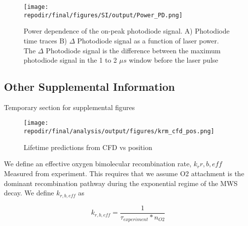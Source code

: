 \begin{figure}[h]
    \texttt{[image: \\repodir/final/figures/SI/output/Power\_PD.png]} 
    \caption{Power dependence of the on-peak photodiode signal. A) Photodiode time traces B) $\Delta$ Photodiode signal as a function of laser power. The $\Delta$ Photodiode signal is the difference between the maximum photodiode signal in the 1 to 2 $\mu s$ window before the laser pulse}
    \label{fig:SI_power_dependence_PD}
\end{figure}

\clearpage

\subsection{Other Supplemental Information}

Temporary section for supplemental figures


\begin{figure}[h]
    \texttt{[image: \\repodir/final/analysis/output/figures/krm\_cfd\_pos.png]} 
    \caption{Lifetime predictions from CFD vs position}
    \label{fig:SI_krm_cfd_pos}
\end{figure}





\clearpage

We define an effective oxygen bimolecular recombination rate, $k_r{r, b,eff}$ Measured from experiment. This requires that we assume O2 attachment is the dominant recombination pathway during the exponential regime of the MWS decay. We define $k_{r,b,eff}$ as 

\begin{equation}
    \label{eq:krbeff}
    k_{r,b,eff} = \frac{1}{\tau_{experiment} *  n_{O2}}
\end{equation}

